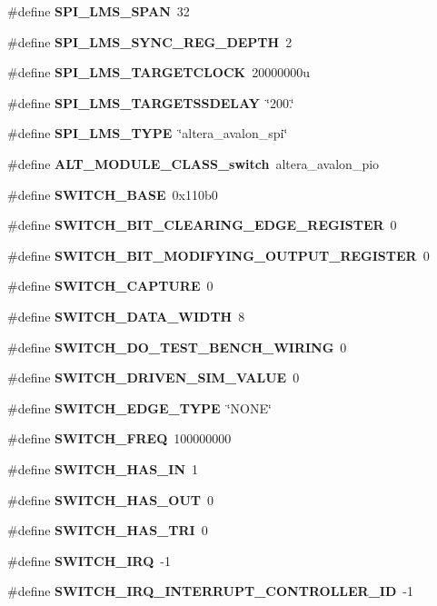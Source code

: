 \begin{DoxyCompactItemize}
\#define {\bf S\+P\+I\+\_\+\+L\+M\+S\+\_\+\+S\+P\+AN}~32
\item 
\#define {\bf S\+P\+I\+\_\+\+L\+M\+S\+\_\+\+S\+Y\+N\+C\+\_\+\+R\+E\+G\+\_\+\+D\+E\+P\+TH}~2
\item 
\#define {\bf S\+P\+I\+\_\+\+L\+M\+S\+\_\+\+T\+A\+R\+G\+E\+T\+C\+L\+O\+CK}~20000000u
\item 
\#define {\bf S\+P\+I\+\_\+\+L\+M\+S\+\_\+\+T\+A\+R\+G\+E\+T\+S\+S\+D\+E\+L\+AY}~\char`\"{}200.\char`\"{}
\item 
\#define {\bf S\+P\+I\+\_\+\+L\+M\+S\+\_\+\+T\+Y\+PE}~\char`\"{}altera\+\_\+avalon\+\_\+spi\char`\"{}
\item 
\#define {\bf A\+L\+T\+\_\+\+M\+O\+D\+U\+L\+E\+\_\+\+C\+L\+A\+S\+S\+\_\+switch}~altera\+\_\+avalon\+\_\+pio
\item 
\#define {\bf S\+W\+I\+T\+C\+H\+\_\+\+B\+A\+SE}~0x110b0
\item 
\#define {\bf S\+W\+I\+T\+C\+H\+\_\+\+B\+I\+T\+\_\+\+C\+L\+E\+A\+R\+I\+N\+G\+\_\+\+E\+D\+G\+E\+\_\+\+R\+E\+G\+I\+S\+T\+ER}~0
\item 
\#define {\bf S\+W\+I\+T\+C\+H\+\_\+\+B\+I\+T\+\_\+\+M\+O\+D\+I\+F\+Y\+I\+N\+G\+\_\+\+O\+U\+T\+P\+U\+T\+\_\+\+R\+E\+G\+I\+S\+T\+ER}~0
\item 
\#define {\bf S\+W\+I\+T\+C\+H\+\_\+\+C\+A\+P\+T\+U\+RE}~0
\item 
\#define {\bf S\+W\+I\+T\+C\+H\+\_\+\+D\+A\+T\+A\+\_\+\+W\+I\+D\+TH}~8
\item 
\#define {\bf S\+W\+I\+T\+C\+H\+\_\+\+D\+O\+\_\+\+T\+E\+S\+T\+\_\+\+B\+E\+N\+C\+H\+\_\+\+W\+I\+R\+I\+NG}~0
\item 
\#define {\bf S\+W\+I\+T\+C\+H\+\_\+\+D\+R\+I\+V\+E\+N\+\_\+\+S\+I\+M\+\_\+\+V\+A\+L\+UE}~0
\item 
\#define {\bf S\+W\+I\+T\+C\+H\+\_\+\+E\+D\+G\+E\+\_\+\+T\+Y\+PE}~\char`\"{}N\+O\+NE\char`\"{}
\item 
\#define {\bf S\+W\+I\+T\+C\+H\+\_\+\+F\+R\+EQ}~100000000
\item 
\#define {\bf S\+W\+I\+T\+C\+H\+\_\+\+H\+A\+S\+\_\+\+IN}~1
\item 
\#define {\bf S\+W\+I\+T\+C\+H\+\_\+\+H\+A\+S\+\_\+\+O\+UT}~0
\item 
\#define {\bf S\+W\+I\+T\+C\+H\+\_\+\+H\+A\+S\+\_\+\+T\+RI}~0
\item 
\#define {\bf S\+W\+I\+T\+C\+H\+\_\+\+I\+RQ}~-\/1
\item 
\#define {\bf S\+W\+I\+T\+C\+H\+\_\+\+I\+R\+Q\+\_\+\+I\+N\+T\+E\+R\+R\+U\+P\+T\+\_\+\+C\+O\+N\+T\+R\+O\+L\+L\+E\+R\+\_\+\+ID}~-\/1

\end{DoxyCompactItemize}
